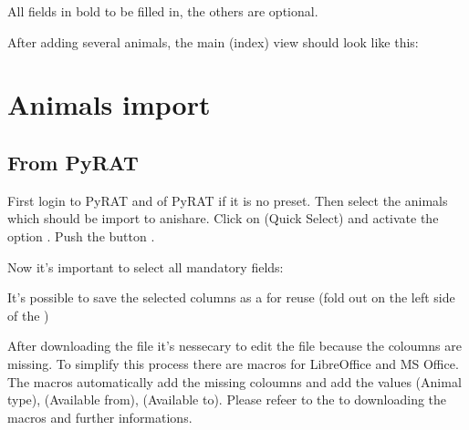 \documentclass[letterpaper,10pt,openany,oneside,english]{sphinxmanual}
\begin{document}
All fields in bold  to be filled in, the others are optional.

After adding several animals, the main (index) view should look like this:

\noindent{}


\section{Animals import}
\label{\detokenize{index:animals-import}}

\subsection{From PyRAT}
\label{\detokenize{index:from-pyrat}}
First login to PyRAT and  of PyRAT if it is no preset. Then select the animals which
should be import to anishare. Click on  (Quick Select) and activate the option .
Push the button .

\noindent{}

Now it’s important to select all mandatory fields:

It’s possible to save the selected columns as a  for reuse (fold out  on the left side of the )

\noindent{}

After downloading the file it’s nessecary to edit the file because the coloumns  are missing.
To simplify this process there are macros for LibreOffice and MS Office. The macros automatically add the missing coloumns and add the values
 (Animal type),  (Available from),  (Available to).
Please refeer to the  to downloading the macros and further informations.
\end{document}
